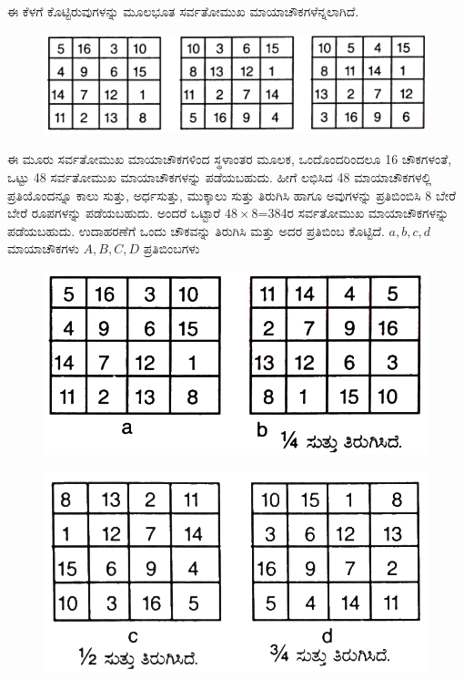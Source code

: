 ಈ ಕೆಳಗೆ ಕೊಟ್ಟಿರುವುಗಳನ್ನು ಮೂಲಭೂತ ಸರ್ವತೋಮುಖ ಮಾಯಾಚೌಕಗಳೆನ್ನಲಾಗಿದೆ.
\begin{figure}[h]
\includegraphics{src/figures/chap4/fig4.10.jpg}
\end{figure}

ಈ ಮೂರು ಸರ್ವತೋಮುಖ ಮಾಯಾಚೌಕಗಳಿಂದ ಸ್ಥಳಾಂತರ ಮೂಲಕ, ಒಂದೊಂದರಿಂದಲೂ 16 ಚೌಕಗಳಂತೆ, ಒಟ್ಟು 48 ಸರ್ವತೋಮುಖ ಮಾಯಾಚೌಕಗಳನ್ನು ಪಡೆಯಬಹುದು. ಹೀಗೆ ಲಭಿಸಿದ 48 ಮಾಯಾಚೌಕಗಳಲ್ಲಿ ಪ್ರತಿಯೊಂದನ್ನೂ ಕಾಲು ಸುತ್ತು, ಅರ್ಧಸುತ್ತು, ಮುಕ್ಕಾಲು ಸುತ್ತು ತಿರುಗಿಸಿ ಹಾಗೂ ಅವುಗಳನ್ನು ಪ್ರತಿಬಿಂಬಿಸಿ 8 ಬೇರೆ ಬೇರೆ ರೂಪಗಳನ್ನು ಪಡೆಯಬಹುದು. ಅಂದರೆ ಒಟ್ಟಾರೆ $48 \times 8$=384ರ ಸರ್ವತೋಮುಖ ಮಾಯಾಚೌಕಗಳನ್ನು ಪಡೆಯಬಹುದು. ಉದಾಹರಣೆಗೆ ಒಂದು ಚೌಕವನ್ನು ತಿರುಗಿಸಿ ಮತ್ತು ಅದರ ಪ್ರತಿಬಿಂಬ ಕೊಟ್ಟಿದೆ. $a, b, c, d$ ಮಾಯಾಚೌಕಗಳು $A, B, C, D$ ಪ್ರತಿಬಿಂಬಗಳು
\begin{figure}[h]
\includegraphics{src/figures/chap4/fig4.11.jpg}
\end{figure}
\begin{figure}[h]
\includegraphics{src/figures/chap4/fig4.12.jpg}
\end{figure}
